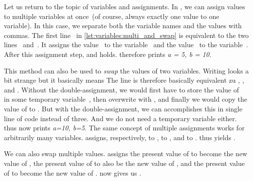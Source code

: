 %
%
%
%
%
Let us return to the topic of variables and assignments.
In \python, we can assign values to multiple variables at once~(of course, always exactly one value to one variable).
In this case, we separate both the variable names and the values with commas.
The first line~\pythonIdx{,} in \cref{lst:variables:multi_and_swap} is equivalent to the two lines~ and~.
It assigns the value~ to the variable~ and the value~ to the variable~.
After this assignment step,  and  holds.
 therefore prints \textit{a = 5, b = 10}.

This method can also be used to \emph{swap} the values of two variables.
Writing  looks a bit strange but it basically means 
The line is therefore basically equivalent zu , , and .
Without the double-assignment, we would first have to store the value of~ in some temporary variable~, then overwrite  with , and finally we would copy the value of  to .
But with the double-assignment, we can accomplishes this in single line of code instead of three.
And we do not need a temporary variable either.
 thus now prints \textit{a=10, b=5}.%
%
%
%
The same concept of multiple assignments works for arbitrarily many variables.
 assigns, respectively,  to ,  to , and  to .
 thus yields .

We can also swap multiple values.
 assigns the present value of  to become the new value of , the present value of  to also be the new value of , and the present value of  to become the new value of .
 now gives us .
%
\FloatBarrier%
\endhsection%
%
